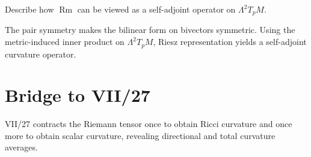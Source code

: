 \begin{problem}\label{prob:vii26-ch05}
Describe how \(\operatorname{Rm}\) can be viewed as a self-adjoint operator on \(\Lambda^2T_pM\).
\end{problem}
\begin{solution}
The pair symmetry makes the bilinear form on bivectors symmetric. Using the metric-induced inner product on \(\Lambda^2T_pM\), Riesz representation yields a self-adjoint curvature operator.
\end{solution}

\section*{Bridge to VII/27}
VII/27 contracts the Riemann tensor once to obtain Ricci curvature and once more to obtain scalar curvature, revealing directional and total curvature averages.

